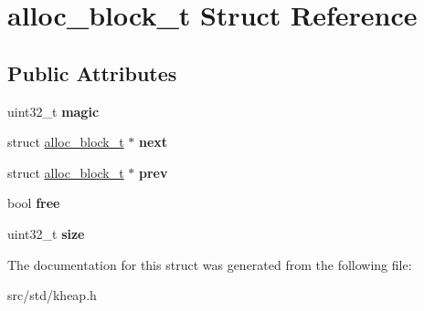 \hypertarget{structalloc__block__t}{}\section{alloc\+\_\+block\+\_\+t Struct Reference}
\label{structalloc__block__t}
\subsection*{Public Attributes}
\begin{DoxyCompactItemize}
\item 
\mbox{\label{structalloc__block__t_ab4caeeeddd944bb0fb4e3a09a72b6098}} 
uint32\+\_\+t {\bfseries magic}
\item 
\mbox{\label{structalloc__block__t_ada5b4aeb55eb5a77ed2d33921a4934a8}} 
struct \hyperlink{structalloc__block__t}{alloc\+\_\+block\+\_\+t} $\ast$ {\bfseries next}
\item 
\mbox{\label{structalloc__block__t_ad0602b7f4361c4a39c56806147d37cf2}} 
struct \hyperlink{structalloc__block__t}{alloc\+\_\+block\+\_\+t} $\ast$ {\bfseries prev}
\item 
\mbox{\label{structalloc__block__t_af069f2fc6c87aff66f3532fd986275be}} 
bool {\bfseries free}
\item 
\mbox{\label{structalloc__block__t_a2204084294453c7d8b4924a97b457591}} 
uint32\+\_\+t {\bfseries size}
\end{DoxyCompactItemize}


The documentation for this struct was generated from the following file\+:\begin{DoxyCompactItemize}
\item 
src/std/kheap.\+h\end{DoxyCompactItemize}

